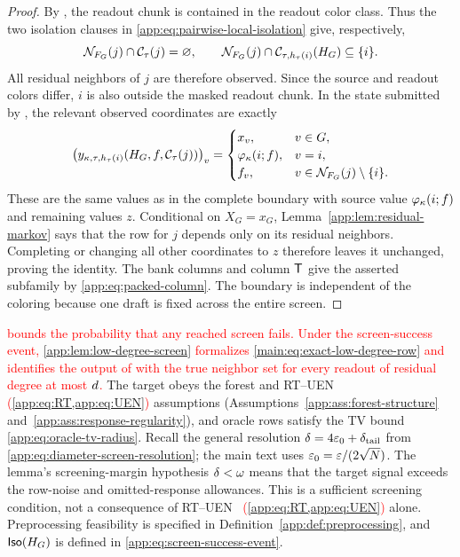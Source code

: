 \begin{proof}
By , the readout chunk is contained in the
readout color class.
Thus the two isolation clauses in \eqref{app:eq:pairwise-local-isolation}
give, respectively,
\[
 \mathcal N_{F_{G}}(j)\cap\mathcal C_{\tau}(j)
 =\varnothing,
 \qquad
 \mathcal N_{F_{G}}(j)\cap
       \mathcal C_{\tau,h_{\tau}(i)}(H_{G})
 \subseteq\{i\}.
\]
All residual neighbors of $j$ are therefore observed.  Since the source
and readout colors differ, $i$ is also outside the masked readout chunk.
In the state submitted by , the relevant
observed coordinates are exactly
\[
 \left(y_{\kappa,\tau,h_{\tau}(i)}(H_{G},f,\mathcal C_{\tau}(j))\right)_v
 =
 \begin{cases}
 x_v,&v\in G,\\
 \varphi_{\kappa}(i;f),&v=i,\\
 f_{v},&v\in\mathcal N_{F_{G}}(j)\setminus\{i\}.
 \end{cases}
\]
These are the same values as in the complete boundary with source value
$\varphi_{\kappa}(i;f)$ and remaining values $z$.  Conditional on
$X_G=x_G$, Lemma~\ref{app:lem:residual-markov} says that the row for $j$
depends only on its residual neighbors.  Completing or changing all other
coordinates to $z$ therefore leaves it unchanged, proving the identity.
The bank columns and column $\mathsf T$ give the asserted subfamily by
\eqref{app:eq:packed-column}.  The boundary is independent of the coloring
because one draft is fixed across the entire screen.
\end{proof}

\textcolor{red}{ bounds the probability
that any reached screen fails.  Under the screen-success event,
\cref{app:lem:low-degree-screen} formalizes \eqref{main:eq:exact-low-degree-row}
and identifies the output of
 with the true neighbor set for every readout
of residual degree at most $d$.}
The target obeys the forest and RT--UEN\textcolor{red}{~%
(\cref{app:eq:RT,app:eq:UEN})} assumptions
(Assumptions~\ref{app:ass:forest-structure}
and~\ref{app:ass:response-regularity}), and oracle rows satisfy the TV bound
\eqref{app:eq:oracle-tv-radius}.
Recall the general resolution
$\delta=4\varepsilon_0+\delta_{\mathrm{tail}}$ from
\eqref{app:eq:diameter-screen-resolution}; the main text uses
$\varepsilon_0=\varepsilon/(2\sqrt N)$.
The lemma's screening-margin hypothesis $\delta<\omega$
means that the target signal exceeds the row-noise and omitted-response allowances.
This is a sufficient screening condition, not a consequence of RT--UEN\textcolor{red}{~%
(\cref{app:eq:RT,app:eq:UEN})} alone.
Preprocessing feasibility is specified in
Definition~\ref{app:def:preprocessing}, and
$\mathsf{Iso}(H_{G})$ is defined in
\eqref{app:eq:screen-success-event}.

